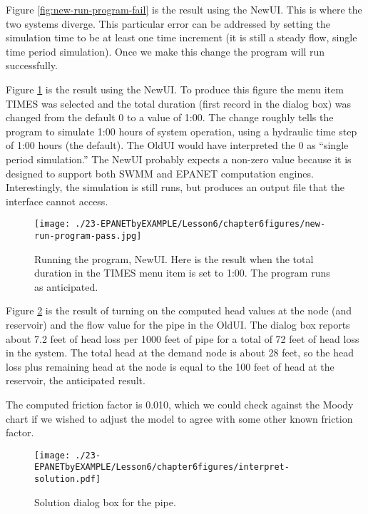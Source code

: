 Figure \ref{fig:new-run-program-fail} is the result using the NewUI.  
This is where the two systems diverge.
This particular error can be addressed by setting the simulation time to be at least one time increment (it is still a steady flow, single time period simulation).
Once we make this change the program will run successfully.

Figure \ref{fig:new-run-program-pass} is the result using the NewUI.  
To produce this figure the menu item TIMES was selected and the total duration (first record in the dialog box) was changed from the default 0 to a value of 1:00.
The change roughly tells the program to simulate 1:00 hours of system operation, using a hydraulic time step of 1:00 hours (the default).
The OldUI would have interpreted the 0 as ``single period simulation.''
The NewUI probably expects a non-zero value because it is designed to support both SWMM and EPANET computation engines.
Interestingly, the simulation is still runs, but produces an output file that the interface cannot access.

\begin{figure}[h!] %
   \centering
   \texttt{[image: ./23-EPANETbyEXAMPLE/Lesson6/chapter6figures/new-run-program-pass.jpg]} 
   \caption{Running the program, NewUI.  Here is the result when the total duration in the TIMES menu item is set to 1:00.  The program runs as anticipated.}
   \label{fig:new-run-program-pass}
\end{figure}
\clearpage

Figure \ref{fig:interpret-solution} is the result of turning on the computed head values at the node (and reservoir) and the flow value for the pipe in the OldUI.  The dialog box reports about 7.2 feet of head loss per 1000 feet of pipe for a total of 72 feet of head loss in the system.   The total head at the demand node is about 28 feet, so the head loss plus remaining head at the node is equal to the 100 feet of head at the reservoir, the anticipated result.  

The computed friction factor is 0.010, which we could check against the Moody chart if we wished to adjust the model to agree with some other known friction factor.   
\begin{figure}[h!] %
   \centering
   \texttt{[image: ./23-EPANETbyEXAMPLE/Lesson6/chapter6figures/interpret-solution.pdf]} 
   \caption{Solution dialog box for the pipe.}
   \label{fig:interpret-solution}
\end{figure}

